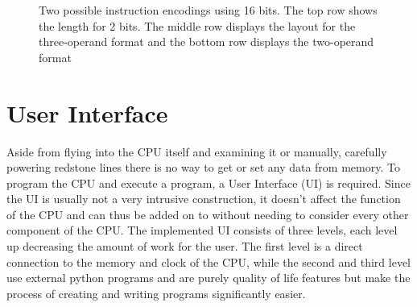 \begin{figure}[h!]
    \begin{center}
        \caption[Instruction Encoding]{Two possible instruction encodings using 16 bits. The top row shows the length for 2 bits. The middle row displays the layout for the three-operand format and the bottom row displays the two-operand format}
        \label{fig::InstructionEncoding}
    \end{center}
\end{figure}

\section{User Interface}
Aside from flying into the CPU itself and examining it or manually, carefully powering redstone lines there is no way to get or set any data from memory. To program the CPU and execute a program, a User Interface (UI) is required. Since the UI is usually not a very intrusive construction, it doesn't affect the function of the CPU and can thus be added on to without needing to consider every other component of the CPU. The implemented UI consists of three levels, each level up decreasing the amount of work for the user. The first level is a direct connection to the memory and clock of the CPU, while the second and third level use external python programs and are purely quality of life features but make the process of creating and writing programs significantly easier.

